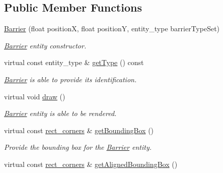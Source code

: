 \subsection*{Public Member Functions}
\begin{DoxyCompactItemize}
\item 
\hyperlink{class_barrier_aa5930a2e2b7cfc516a9badd3fcc8babd}{Barrier} (float position\+X, float position\+Y, entity\+\_\+type barrier\+Type\+Set)
\begin{DoxyCompactList}\small\item\em \hyperlink{class_barrier}{Barrier} entity constructor. \end{DoxyCompactList}\item 
\hypertarget{class_barrier_a649b80eadc6948e68947f7516fee258c}{virtual const entity\+\_\+type \& \hyperlink{class_barrier_a649b80eadc6948e68947f7516fee258c}{get\+Type} () const }\label{class_barrier_a649b80eadc6948e68947f7516fee258c}

\begin{DoxyCompactList}\small\item\em \hyperlink{class_barrier}{Barrier} is able to provide its identification. \end{DoxyCompactList}\item 
\hypertarget{class_barrier_a17cb20afd2fe9e63618e234da9d6c97b}{virtual void \hyperlink{class_barrier_a17cb20afd2fe9e63618e234da9d6c97b}{draw} ()}\label{class_barrier_a17cb20afd2fe9e63618e234da9d6c97b}

\begin{DoxyCompactList}\small\item\em \hyperlink{class_barrier}{Barrier} entity is able to be rendered. \end{DoxyCompactList}\item 
\hypertarget{class_barrier_a050de6c9ffbb0a321c6d8a2e3d1dd418}{virtual const \hyperlink{structrect__corners}{rect\+\_\+corners} \& \hyperlink{class_barrier_a050de6c9ffbb0a321c6d8a2e3d1dd418}{get\+Bounding\+Box} ()}\label{class_barrier_a050de6c9ffbb0a321c6d8a2e3d1dd418}

\begin{DoxyCompactList}\small\item\em Provide the bounding box for the \hyperlink{class_barrier}{Barrier} entity. \end{DoxyCompactList}\item 
\hypertarget{class_barrier_a5fe813c8e78457566a5ff61235c12ea6}{virtual const \hyperlink{structrect__corners}{rect\+\_\+corners} \& \hyperlink{class_barrier_a5fe813c8e78457566a5ff61235c12ea6}{get\+Aligned\+Bounding\+Box} ()}\label{class_barrier_a5fe813c8e78457566a5ff61235c12ea6}


\end{DoxyCompactItemize}
